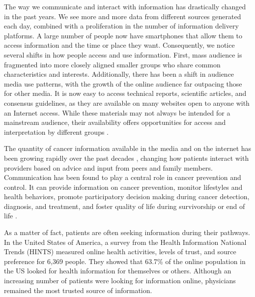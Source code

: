 The way we communicate and interact with information has drastically changed in the past years. We see more and more data from different sources generated each day, combined with a proliferation in the number of information delivery platforms. A large number of people now have smartphones that allow them to access information and the time or place they want. Consequently, we notice several shifts in how people access and use information. First, mass audience is fragmented into more closely aligned smaller groups who share common characteristics and interests. Additionally, there has been a shift in audience media use patterns, with the growth of the online audience far outpacing those for other media. It is now easy to access technical reports, scientific articles, and consensus guidelines, as they are available on many websites open to anyone with an Internet access. While these materials may not always be intended for a mainstream audience, their availability offers opportunities for access and interpretation by different groups \cite{viswanath_communications_2012}.

The quantity of cancer information available in the media and on the internet has been growing rapidly over the past decades \cite{viswanath_science_2005,viswanath_communications_2012}, changing how patients interact with providers based on advice and input from peers and family members. Communication has been found to play a central role in cancer prevention and control. It can provide information on cancer prevention, monitor lifestyles and health behaviors, promote participatory decision making during cancer detection, diagnosis, and treatment, and foster quality of life during survivorship or end of life  \cite{viswanath_communications_2012}.

As a matter of fact, patients are often seeking information during their pathways. In the United States of America, a survey from the Health Information National Trends (HINTS) \cite{hesse_trust_2005} measured online health activities, levels of trust, and source preference for 6,369 people. They showed that 63.7\% of the online population in the US looked for health information for themselves or others. Although an increasing number of patients were looking for information online, physicians remained the most trusted source of information.

